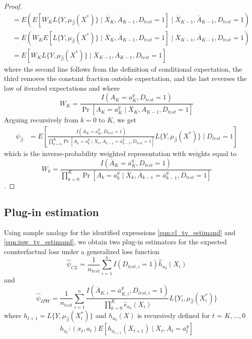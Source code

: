 \begin{proof}
\begin{align*}
        &= E\left(E\left[W_K L\{Y, \mu_{\widehat{\beta}}(X^*)\} \mid \overline{X}_K, \overline{A}_{K-1}, D_{test} = 1\right] \mid \overline{X}_{K-1}, \overline{A}_{K-1}, D_{test} = 1\right)\\
        &= E\left(W_K E\left[L\{Y, \mu_{\widehat{\beta}}(X^*)\} \mid \overline{X}_K, \overline{A}_{K-1}, D_{test} = 1\right] \mid \overline{X}_{K-1}, \overline{A}_{K-1}, D_{test} = 1\right)\\
        &= E\left[W_K L\{Y, \mu_{\widehat{\beta}}(X^*)\} \mid \overline{X}_{K-1}, \overline{A}_{K-1}, D_{test} = 1\right]
    \end{align*}
    where the second line follows from the definition of conditional expectation, the third removes the constant fraction outside expectation, and the last reverses the law of iterated expectations and where 
    $$W_K = \frac{I(A_K = a_K^g, D_{test} = 1)}{\Pr[A_K = a_K^g \mid \overline{X}_K, \overline{A}_{K-1}, D_{test} = 1]}$$
    Arguing recursively from $k = 0$ to $K$, we get
    \begin{align*}
        \psi_{\widehat{\beta}} &= E\left[\frac{I(\overline{A}_K = \overline{a}^g_K, D_{test} = 1)}{\prod_{k=0}^K\Pr[A_k = a^g_k \mid \overline{X}_k, \overline{A}_{k-1} = \overline{a}^g_{k-1}, D_{test} = 1]}L\{Y, \mu_{\widehat{\beta}}(X^*)\} \mid D_{test} = 1\right] 
    \end{align*}
    which is the inverse-probability weighted representation with weights equal to 
    $$W_k = \frac{I(\overline{A}_K = \overline{a}^g_K, D_{test} = 1)}{\prod_{k=0}^K\Pr[A_k = a^g_k \mid \overline{X}_k, \overline{A}_{k-1} = \overline{a}^g_{k-1}, D_{test} = 1]}$$
    .
\end{proof}

\subsection{Plug-in estimation}
Using sample analogs for the identified expressions \ref{eqn:cl_tv_estimand} and \ref{eqn:ipw_tv_estimand}, we obtain two plug-in estimators for the expected counterfactual loss under a generalized loss function
\begin{equation*}
    \widehat{\psi}_{CL} = \frac{1}{n_{test}}\sum_{i=1}^nI(D_{test, i} = 1)\widehat{h}_{a_0}(X_i)
\end{equation*}
and 
\begin{equation*}
    \widehat{\psi}_{IPW} = \frac{1}{n_{test}}\sum_{i=1}^n \frac{I(\overline{A}_{K,i} = \overline{a}^g_{K,i}, D_{test,i} = 1)}{\prod_{k=0}^K \widehat{e}_{a_k}(X_i)} L\{Y_i, \mu_{\widehat{\beta}}(X^*_i)\}
\end{equation*}
where $h_{t+1} = L\{Y, \mu_{\widehat{\beta}}(X^*_i)\}$ and $h_{a_0}(X)$ is recursively defined for $t$ = $K, \ldots, 0$
\[h_{a_t} : (x_t, a_t) E[ h_{a_{t+1}}(X_{t+1}) \mid \overline{X}_t, \overline{A}_t = \overline{a}^g_t]\]

